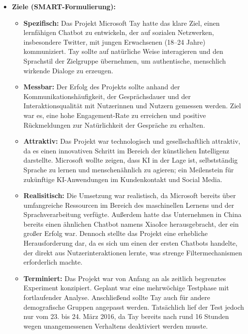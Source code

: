 \documentclass{article}
\begin{document}
\begin{itemize}
  \item \textbf{Ziele (SMART-Formulierung):}
  \begin{itemize}
    \item \textbf{Spezifisch:} Das Projekt Microsoft Tay hatte das klare Ziel, einen lernfähigen Chatbot zu entwickeln, der auf sozialen Netzwerken, 
    insbesondere Twitter, mit jungen Erwachsenen (18–24 Jahre) kommuniziert. 
    Tay sollte auf natürliche Weise interagieren und den Sprachstil der Zielgruppe übernehmen, um authentische, menschlich wirkende Dialoge zu erzeugen.
    \item \textbf{Messbar:} Der Erfolg des Projekts sollte anhand der Kommunikationshäufigkeit, der Gesprächsdauer und
    der Interaktionsqualität mit Nutzerinnen und Nutzern gemessen werden. Ziel war es, eine hohe 
  Engagement-Rate zu erreichen und positive Rückmeldungen zur Natürlichkeit der Gespräche zu erhalten.
    \item \textbf{Attraktiv:} Das Projekt war technologisch und gesellschaftlich attraktiv, da es einen innovativen Schritt im 
    Bereich der künstlichen Intelligenz darstellte. Microsoft wollte zeigen, dass KI in der Lage ist, 
    selbstständig Sprache zu lernen und menschenähnlich zu agieren; ein Meilenstein für zukünftige KI-Anwendungen im Kundenkontakt und Social Media.
    \item \textbf{Realisitisch:} Die Umsetzung war realistisch, da Microsoft bereits über umfangreiche Ressourcen im Bereich 
    des maschinellen Lernens und der Sprachverarbeitung verfügte. Außerdem hatte das 
    Unternehmen in China bereits einen ähnlichen Chatbot namens XiaoIce herausgebracht, der ein 
    großer Erfolg war. Dennoch stellte das Projekt eine erhebliche Herausforderung dar, da es sich 
    um einen der ersten Chatbots handelte, der direkt aus Nutzerinteraktionen lernte, was strenge Filtermechanismen erforderlich machte.
    \item \textbf{Terminiert:} Das Projekt war von Anfang an als zeitlich begrenztes Experiment konzipiert. Geplant war eine 
    mehrwöchige Testphase mit fortlaufender Analyse. Anschließend sollte Tay auch für andere 
    demografische Gruppen angepasst werden. Tatsächlich lief der Test jedoch nur vom 23. bis 24. März 2016, da Tay 
    bereits nach rund 16 Stunden wegen unangemessenen Verhaltens deaktiviert werden musste.
  \end{itemize}


\end{itemize}
\end{document}
